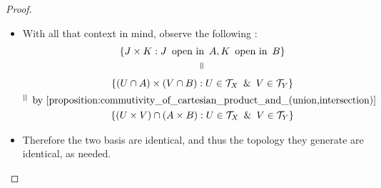 \begin{proof}
\begin{itemize}
    \item With all that context in mind, observe the following :
    \begin{gather*}
        \left\{ J \times K: J \enspace \text{open in} \enspace A, K \enspace
        \text{open in} \enspace B \right\} \\
        \verteq\\
        \left\{ \left( U \cap A \right) \times \left( V \cap  B \right):
        U \in \mathcal{ T } _{ X } \enspace \& \enspace V \in \mathcal{ T }
        _{ Y } \right\} \\
        \verteq \enspace \text{by
        \ref{proposition:commutivity_of_cartesian_product_and_(union,intersection)}}
        \enspace  \\
        \left\{ \left(  U \times V \right) \cap \left( A \times B \right) :
        U \in \mathcal{ T } _{ X } \enspace \& \enspace V \in  \mathcal{ T }
        _{ Y } \right\} 
    \end{gather*}
    \item Therefore the two basis are identical, and thus the topology they
    generate are identical, as needed.
\end{itemize}
\end{proof}

